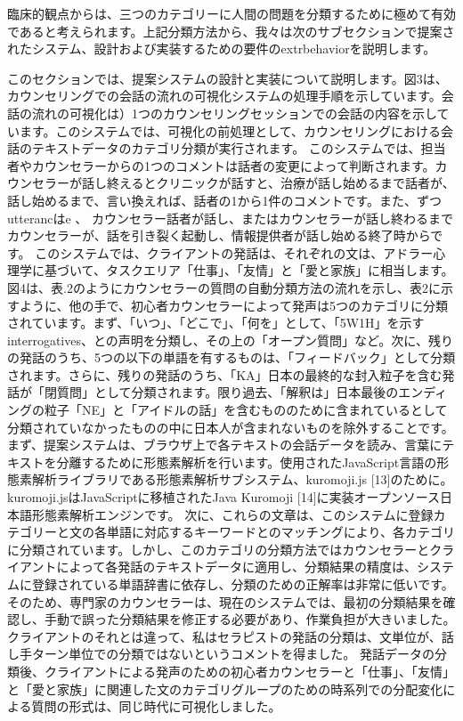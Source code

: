 \documentclass[shuuron]{kuee}
\begin{document}
  臨床的観点からは、三つのカテゴリーに人間の問題を分類するために極めて有効であると考えられます。上記分類方法から、我々は次のサブセクションで提案されたシステム、設計および実装するための要件のextrbehaviorを説明します。


  このセクションでは、提案システムの設計と実装について説明します。図3は、カウンセリングでの会話の流れの可視化システムの処理手順を示しています。会話の流れの可視化は）1つのカウンセリングセッションでの会話の内容を示しています。このシステムでは、可視化の前処理として、カウンセリングにおける会話のテキストデータのカテゴリ分類が実行されます。
  このシステムでは、担当者やカウンセラーからの1つのコメントは話者の変更によって判断されます。カウンセラーが話し終えるとクリニックが話すと、治療が話し始めるまで話者が、話し始めるまで、言い換えれば、話者の1から1件のコメントです。また、ずつutterancはe  、 カウンセラー話者が話し、またはカウンセラーが話し終わるまでカウンセラーが、話を引き裂く起動し、情報提供者が話し始める終了時からです。
  このシステムでは、クライアントの発話は、それぞれの文は、アドラー心理学に基づいて、タスクエリア「仕事」、「友情」と「愛と家族」に相当します。図4は、表.2のようにカウンセラーの質問の自動分類方法の流れを示し、表2に示すように、他の手で、初心者カウンセラーによって発声は5つのカテゴリに分類されています。まず、「いつ」、「どこで」、「何を」として、「5W1H」を示すinterrogatives、との声明を分類し、その上の「オープン質問」など。次に、残りの発話のうち、5つの以下の単語を有するものは、「フィードバック」として分類されます。さらに、残りの発話のうち、「KA」日本の最終的な封入粒子を含む発話が「閉質問」として分類されます。限り過去、「解釈は」日本最後のエンディングの粒子「NE」と「アイドルの話」を含むもののために含まれているとして分類されていなかったものの中に日本人が含まれないものを除外することです。
まず、提案システムは、ブラウザ上で各テキストの会話データを読み、言葉にテキストを分離するために形態素解析を行います。使用されたJavaScript言語の形態素解析ライブラリである形態素解析サブシステム、kuromoji.js [13]のために。 kuromoji.jsはJavaScriptに移植されたJava Kuromoji [14]に実装オープンソース日本語形態素解析エンジンです。
  次に、これらの文章は、このシステムに登録カテゴリーと文の各単語に対応するキーワードとのマッチングにより、各カテゴリに分類されています。しかし、このカテゴリの分類方法ではカウンセラーとクライアントによって各発話のテキストデータに適用し、分類結果の精度は、システムに登録されている単語辞書に依存し、分類のための正解率は非常に低いです。そのため、専門家のカウンセラーは、現在のシステムでは、最初の分類結果を確認し、手動で誤った分類結果を修正する必要があり、作業負担が大きいました。クライアントのそれとは違って、私はセラピストの発話の分類は、文単位が、話し手ターン単位での分類ではないというコメントを得ました。
発話データの分類後、クライアントによる発声のための初心者カウンセラーと「仕事」、「友情」と「愛と家族」に関連した文のカテゴリグループのための時系列での分配変化による質問の形式は、同じ時代に可視化しました。
\end{document}
